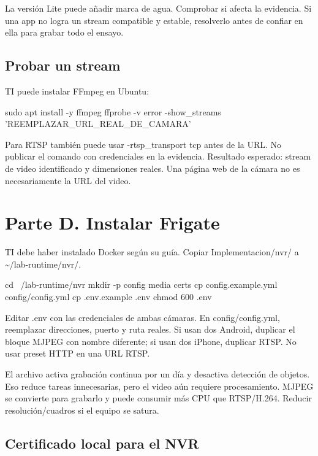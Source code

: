 \documentclass[12pt,a4paper]{article}
\begin{document}
La versión Lite puede añadir marca de agua. Comprobar si afecta la evidencia. Si una app no logra un stream compatible y estable, resolverlo antes de confiar en ella para grabar todo el ensayo.\par
{}\subsection*{Probar un stream}
TI puede instalar FFmpeg en Ubuntu:\par
{}
\begin{Comandos}
sudo apt install -y ffmpeg
ffprobe -v error -show_streams 'REEMPLAZAR_URL_REAL_DE_CAMARA'
\end{Comandos}
Para RTSP también puede usar \textnormal{-rtsp\_\allowbreak{}transport tcp} antes de la URL. No publicar el comando con credenciales en la evidencia. Resultado esperado: stream de video identificado y dimensiones reales. Una página web de la cámara no es necesariamente la URL del video.\par
{}\section*{Parte D. Instalar Frigate}
TI debe haber instalado Docker según su guía. Copiar \textnormal{Implementacion/\allowbreak{}nvr/\allowbreak{}} a \textnormal{\textasciitilde{}/\allowbreak{}lab-runtime/\allowbreak{}nvr/\allowbreak{}}.\par
{}
\begin{Comandos}
cd ~/lab-runtime/nvr
mkdir -p config media certs
cp config.example.yml config/config.yml
cp .env.example .env
chmod 600 .env
\end{Comandos}
Editar \textnormal{.env} con las credenciales de ambas cámaras. En \textnormal{config/\allowbreak{}config.yml}, reemplazar direcciones, puerto y ruta reales. Si usan dos Android, duplicar el bloque MJPEG con nombre diferente; si usan dos iPhone, duplicar RTSP. No usar preset HTTP en una URL RTSP.\par
El archivo activa grabación continua por un día y desactiva detección de objetos. Eso reduce tareas innecesarias, pero el video aún requiere procesamiento. MJPEG se convierte para grabarlo y puede consumir más CPU que RTSP/H.264. Reducir resolución/cuadros si el equipo se satura.\par
{}\subsection*{Certificado local para el NVR}
\end{document}
